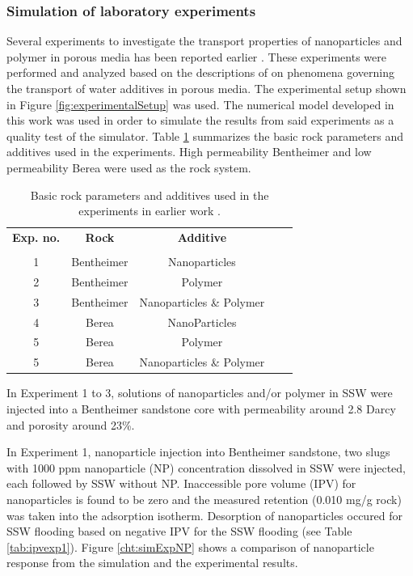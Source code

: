 \documentclass[nanomaterials,article,submit,moreauthors,pdftex]{Definitions/mdpi}
\begin{document}
\subsubsection{Simulation of laboratory experiments}
Several experiments to investigate the transport properties of nanoparticles and polymer in porous media has been reported earlier \cite{Najafiazar2016}. These experiments were performed and analyzed based on the descriptions of \citet{Lotsch1985} on phenomena governing the transport of water additives in porous media. The experimental setup shown in Figure \ref{fig:experimentalSetup} was used. The numerical model developed in this work was used in order to simulate the results from said experiments as a quality test of the simulator. Table \ref{tab:rockParams} summarizes the basic rock parameters and additives used in the experiments. High permeability Bentheimer and low permeability Berea were used as the rock system. 

\begin{table}[h!]
\small
\centering
\caption{Basic rock parameters and additives used in the experiments in earlier work \cite{Najafiazar2016}.}
\label{tab:rockParams}
\begin{tabular}{c c c c l } 
\toprule
\textbf{Exp. no.} & \textbf{Rock}  & \textbf{Additive} \\ 
& & \\
\midrule 
1   & Bentheimer & Nanoparticles\\
2   & Bentheimer & Polymer \\ 
3   & Bentheimer & Nanoparticles \& Polymer \\ 
4   & Berea        & NanoParticles\\
5   & Berea        & Polymer \\ 
5   & Berea        & Nanoparticles \& Polymer \\ 
\bottomrule
\end{tabular}
\end{table}

In Experiment 1 to 3, solutions of nanoparticles and/or polymer in SSW were injected into a Bentheimer sandstone core with permeability around 2.8 Darcy and porosity around 23\%.

In Experiment 1, nanoparticle injection into Bentheimer sandstone, two slugs with 1000 ppm nanoparticle (NP) concentration dissolved in SSW were injected, each followed by SSW without NP. Inaccessible pore volume (IPV) for nanoparticles is found to be zero and the measured retention (0.010 mg/g rock) was taken into the adsorption isotherm. Desorption of nanoparticles occured for SSW flooding based on negative IPV for the SSW flooding (see Table \ref{tab:ipvexp1}). Figure \ref{cht:simExpNP} shows a comparison of nanoparticle response from the simulation and the experimental results.
\end{document}
